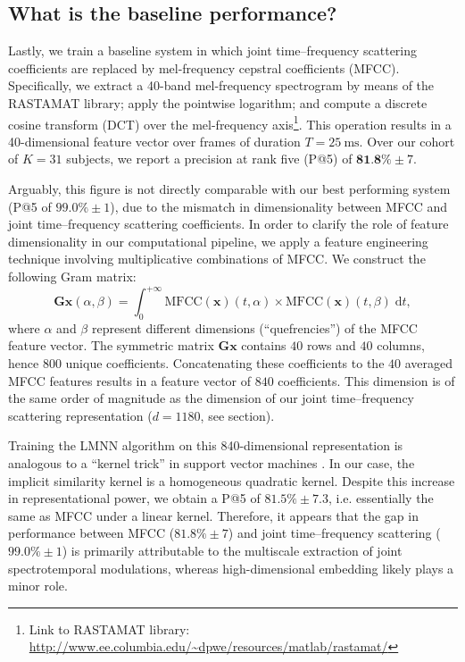 \documentclass{bmcart}
\newcommand{\lnameref}[1]{%
\bgroup
\let\nmu\MakeLowercase
\nameref{#1}\egroup}
\newcommand{\nmu}{}
\begin{document}
\subsection*{What is the baseline performance?}
Lastly, we train a baseline system in which joint time--frequency scattering coefficients are replaced by mel-frequency cepstral coefficients (MFCC).
Specifically, we extract a 40-band mel-frequency spectrogram by means of the RASTAMAT library; apply the pointwise logarithm; and compute a discrete cosine transform (DCT) over the mel-frequency axis\footnote{Link to RASTAMAT library: \url{http://www.ee.columbia.edu/~dpwe/resources/matlab/rastamat/}}.
This operation results in a 40-dimensional feature vector over frames of duration $T=\SI{25}{\milli\second}$.
Over our cohort of $K=31$ subjects, we report a precision at rank five (P@5) of $\textbf{81.8\%} \pm 7$.

Arguably, this figure is not directly comparable with our best performing system (P@5 of $99.0\%\pm 1$), due to the mismatch in dimensionality between MFCC and joint time--frequency scattering coefficients.
In order to clarify the role of feature dimensionality in our computational pipeline, we apply a feature engineering technique involving multiplicative combinations of MFCC.
We construct the following Gram matrix:
\begin{equation}
\mathbf{G} \boldsymbol{x}(\alpha, \beta) =
\int_0^{+\infty}
\mathrm{MFCC}(\boldsymbol{x})(t, \alpha)
\times
\mathrm{MFCC}(\boldsymbol{x})(t, \beta)
\;\mathrm{d}t,
\end{equation}
where $\alpha$ and $\beta$ represent different dimensions (``quefrencies'') of the MFCC feature vector.
The symmetric matrix $\mathbf{G}\boldsymbol{x}$ contains $40$ rows and $40$ columns, hence $800$ unique coefficients.
Concatenating these coefficients to the $40$ averaged MFCC features results in a feature vector of $840$ coefficients.
This dimension is of the same order of magnitude as the dimension of our joint time--frequency scattering representation ($d=1180$, see \lnameref{sec:methods} section).

Training the LMNN algorithm on this 840-dimensional representation is analogous to a ``kernel trick'' in support vector machines \cite{chang2010jmlr}.
In our case, the implicit similarity kernel is a homogeneous quadratic kernel.
Despite this increase in representational power, we obtain a P@5 of $81.5\% \pm 7.3$, i.e. essentially the same as MFCC under a linear kernel.
Therefore, it appears that the gap in performance between MFCC ($81.8\%\pm 7$) and joint time--frequency scattering ($99.0\% \pm 1$) is primarily attributable to the multiscale extraction of joint spectrotemporal modulations, whereas high-dimensional embedding likely plays a minor role.
\end{document}
